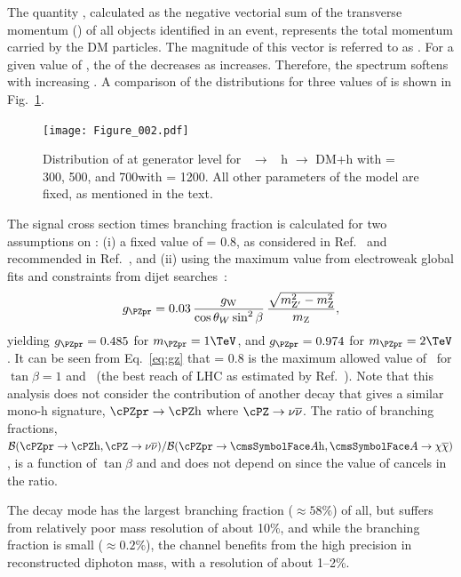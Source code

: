 The quantity \ptvecmiss, calculated as the negative vectorial sum of the transverse momentum (\pt) of all objects identified in an event, represents the total
momentum carried by the DM particles. 
The magnitude of this vector is referred to as \MET.  
For a given value of \mzp, the \pt of the \Az decreases as \maz increases. 
Therefore, the \MET spectrum softens with increasing \maz. 
A comparison of the \MET distributions for three values of \maz is shown in Fig.~\ref{fig:mA0}. 

\begin{figure}[htbp]
\centering
\texttt{[image: Figure\_002.pdf]}
\caption{Distribution of \MET at generator level for \cPZpr\ $\rightarrow$ \Az~h $\rightarrow$ DM+h with \maz = 300, 500, and 700\GeV with \mzp = 1200\GeV. All other parameters of the model are fixed, as mentioned in the text.}
\label{fig:mA0}
\end{figure}

The signal cross section times branching fraction is calculated 
for two assumptions on \gzp: 
(i) a fixed value of \gzp = 0.8, as considered in Ref.~\cite{ATLAS-2015-PAS} and recommended in 
Ref.~\cite{Abercrombie:2015wmb}, 
and (ii) using the maximum value from electroweak global fits and 
constraints from dijet searches~\cite{2HDM,private}:
\begin{equation}
\label{eq:gz}
\gzp = 0.03\, \frac{g_{\mathrm{W}}}{\cos\theta_{W}\sin^{2}\beta} \, \frac{\sqrt{m_{\mathrm{Z'}}^{2}-m_{\mathrm{Z}}^{2}}}{m_{\mathrm{Z}}}, 
\end{equation} 
yielding $\gzp=0.485$ for $\mzp=1\TeV$, and $\gzp=0.974$ for $\mzp=2\TeV$. 
It can be seen from Eq.~\ref{eq:gz} that \gzp = 0.8 is the maximum allowed value of \gzp\ for 
$\tan \beta=1$ and ~\TeV (the best reach of LHC as estimated by Ref.~\cite{2HDM}).  
Note that this analysis does not consider the contribution of another decay that gives a similar mono-h 
signature, $\cPZpr\rightarrow \cPZ \mathrm{h}$ where $\cPZ\rightarrow\nu\overline{\nu}$. 
The ratio of branching fractions, 
${\cal B}(\cPZpr\rightarrow \cPZ \mathrm{h},\cPZ\rightarrow\nu\overline{\nu})/{\cal B}(\cPZpr \rightarrow \Az \mathrm{h},\Az\rightarrow\chi\overline{\chi})$, 
is a function of $\tan \beta$ and \mzp and does not depend on \gzp since 
the value of \gzp cancels in the ratio.


The \Hbb  decay mode has the largest branching fraction (${\approx} 58 \%$) of all, but suffers from relatively poor mass resolution of about 10\%, and while the \HGG branching fraction is small (${\approx} 0.2\%$), the channel benefits from the high precision in reconstructed diphoton mass, with a resolution of about 1--2\%.

